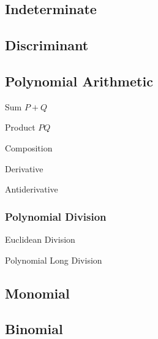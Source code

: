 \subsection{Indeterminate}\label{sec:indeterminate}

\subsection{Discriminant}\label{sec:discriminant}

\subsection{Polynomial Arithmetic}\label{sec:polynomial_arithmetic}

Sum $P + Q$

Product $P Q$

Composition

Derivative

Antiderivative



\subsubsection{Polynomial Division}\label{sec:polynomial_division}

Euclidean Division

Polynomial Long Division



\subsection{Monomial}\label{sec:monomial}

\subsection{Binomial}\label{sec:binomial}

